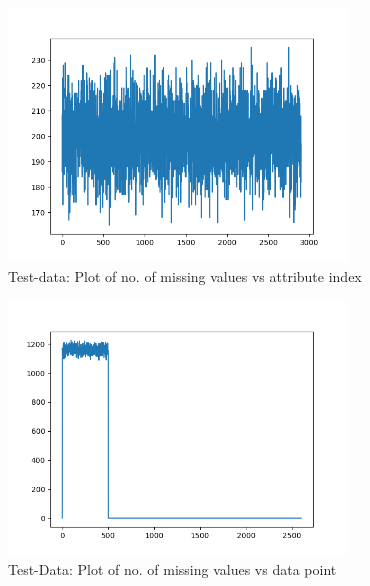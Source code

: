 \documentclass[12pt]{report}
\begin{document}
\begin{figure}[H]
  \centering
  \includegraphics[width=0.8\textwidth]{row_wise_test.png}
  \caption{Test-data: Plot of no. of missing values vs attribute index}
\end{figure}

\begin{figure}[H]
  \centering
  \includegraphics[width=0.8\textwidth]{col_wise_test.png}
  \caption{Test-Data: Plot of no. of missing values vs data point}
\end{figure}
\end{document}
